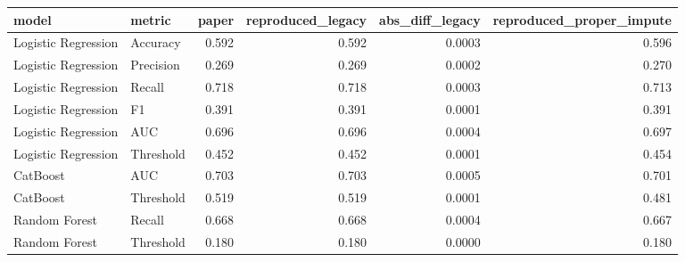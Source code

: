 \begin{tabular}{llrrrr}
\toprule
model & metric & paper & reproduced\_legacy & abs\_diff\_legacy & reproduced\_proper\_impute \\
\midrule
Logistic Regression & Accuracy & 0.592 & 0.592 & 0.0003 & 0.596 \\
Logistic Regression & Precision & 0.269 & 0.269 & 0.0002 & 0.270 \\
Logistic Regression & Recall & 0.718 & 0.718 & 0.0003 & 0.713 \\
Logistic Regression & F1 & 0.391 & 0.391 & 0.0001 & 0.391 \\
Logistic Regression & AUC & 0.696 & 0.696 & 0.0004 & 0.697 \\
Logistic Regression & Threshold & 0.452 & 0.452 & 0.0001 & 0.454 \\
CatBoost & AUC & 0.703 & 0.703 & 0.0005 & 0.701 \\
CatBoost & Threshold & 0.519 & 0.519 & 0.0001 & 0.481 \\
Random Forest & Recall & 0.668 & 0.668 & 0.0004 & 0.667 \\
Random Forest & Threshold & 0.180 & 0.180 & 0.0000 & 0.180 \\
\bottomrule
\end{tabular}
